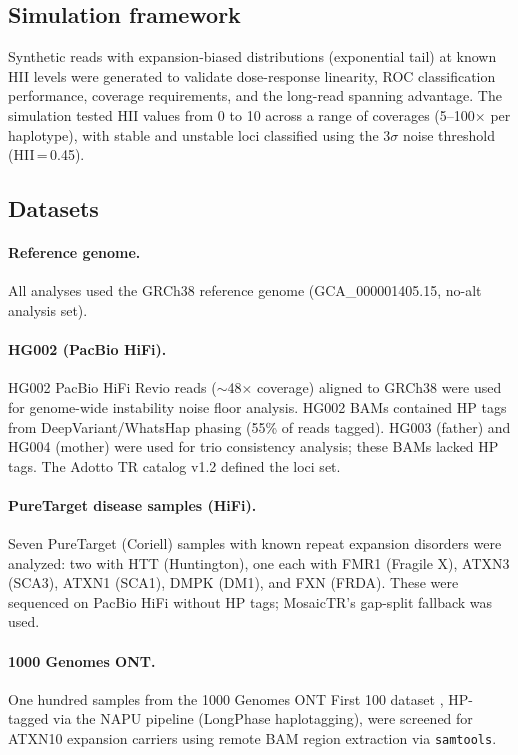 \documentclass[12pt]{article}
\begin{document}
\subsection{Simulation framework}

Synthetic reads with expansion-biased distributions (exponential tail) at known HII levels were generated to validate dose-response linearity, ROC classification performance, coverage requirements, and the long-read spanning advantage.
The simulation tested HII values from 0 to 10 across a range of coverages (5--100$\times$ per haplotype), with stable and unstable loci classified using the 3$\sigma$ noise threshold (HII\,=\,0.45).

\subsection{Datasets}

\paragraph{Reference genome.}
All analyses used the GRCh38 reference genome (GCA\_000001405.15, no-alt analysis set).

\paragraph{HG002 (PacBio HiFi).}
HG002 PacBio HiFi Revio reads ($\sim$48$\times$ coverage) aligned to GRCh38 were used for genome-wide instability noise floor analysis.
HG002 BAMs contained HP tags from DeepVariant/WhatsHap phasing (55\% of reads tagged).
HG003 (father) and HG004 (mother) were used for trio consistency analysis; these BAMs lacked HP tags.
The Adotto TR catalog v1.2 \citep{dolzhenko2024} defined the loci set.

\paragraph{PureTarget disease samples (HiFi).}
Seven PureTarget (Coriell) samples with known repeat expansion disorders were analyzed: two with HTT (Huntington), one each with FMR1 (Fragile X), ATXN3 (SCA3), ATXN1 (SCA1), DMPK (DM1), and FXN (FRDA).
These were sequenced on PacBio HiFi without HP tags; MosaicTR's gap-split fallback was used.

\paragraph{1000 Genomes ONT.}
One hundred samples from the 1000 Genomes ONT First 100 dataset \citep{gustafson2024}, HP-tagged via the NAPU pipeline (LongPhase haplotagging), were screened for ATXN10 expansion carriers using remote BAM region extraction via \texttt{samtools}.
\end{document}
